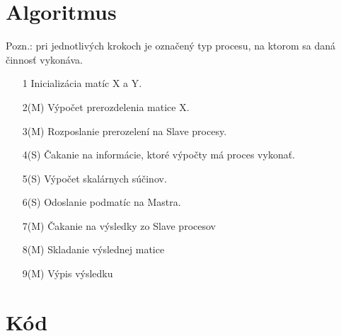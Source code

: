 \documentclass{report}
\begin{document}
\section{Algoritmus}
Pozn.: pri jednotlivých krokoch je označený typ procesu, na ktorom sa daná činnosť vykonáva.\\
\begin{enumerate}
\item[1] Inicializácia matíc X a Y.
\item[2(M)] Výpočet prerozdelenia matice X.
\item[3(M)] Rozposlanie prerozelení na Slave procesy.
\item[4(S)] Čakanie na informácie, ktoré výpočty má proces vykonať.
\item[5(S)] Výpočet skalárnych súčinov.
\item[6(S)] Odoslanie podmatíc na Mastra.
\item[7(M)] Čakanie na výsledky zo Slave procesov
\item[8(M)] Skladanie výslednej matice
\item[9(M)] Výpis výsledku
\end{enumerate}

\section{Kód}
\end{document}
